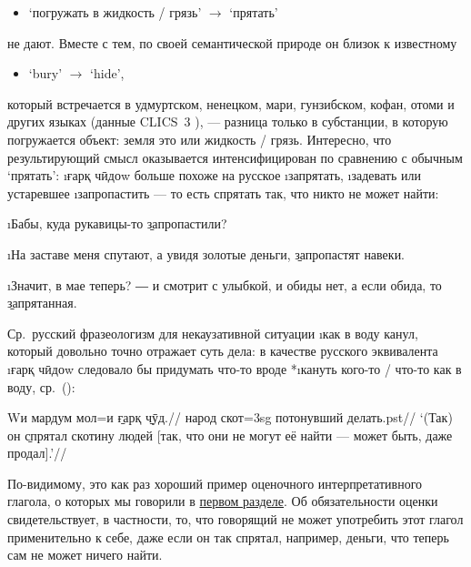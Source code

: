 \begin{itemize}
  \item ‘погружать в жидкость / грязь’ $\rightarrow$ ‘прятать’
\end{itemize}

не дают. Вместе с тем, по своей семантической природе он близок к известному

\begin{itemize}
  \item ‘bury’ $\rightarrow$ ‘hide’,
\end{itemize}

который встречается в удмуртском, ненецком, мари, гунзибском, кофан, отоми и других языках (данные CLICS~3 \parencite{clics2020}), — разница только в субстанции, в которую погружается объект: земля это или жидкость / грязь. Интересно, что результирующий смысл оказывается интенсифицирован по сравнению с обычным ‘прятать’: \i{ғарқ чӣдоw} больше похоже на русское \i{запрятать}, \i{задевать} или устаревшее \i{запропастить} — то есть спрятать так, что никто не может найти:

\i{Бабы, куда рукавицы-то \b{запропастили}?}  \xe

\i{На заставе меня спутают, а увидя золотые деньги, \b{запропастят} навеки.}  \xe

\i{Значит, в мае теперь? ― и смотрит с улыбкой, и обиды нет, а если обида, то \b{запрятанная}.}  \xe

Ср.~русский фразеологизм для некаузативной ситуации \i{как в воду канул}, который довольно точно отражает суть дела: в качестве русского эквивалента \i{ғарқ чӣдоw} следовало бы придумать что-то вроде *\i{кануть кого-то / что-то как в воду}, ср.~():

\begingl
\gla Wи мардум мол=и \b{ғарқ} \b{чӯд}.//
 народ скот={\sc 3sg} потонувший делать.{\sc pst}//
\glft ‘(Так) он \b{спрятал} скотину людей [так, что они не могут её найти — может быть, даже продал].’//
\endgl \xe

По-видимому, это как раз хороший пример оценочного интерпретативного глагола, о которых мы говорили в \hyperref[hide-intro]{первом разделе}. Об обязательности оценки свидетельствует, в частности, то, что говорящий не может употребить этот глагол применительно к себе, даже если он так спрятал, например, деньги, что теперь сам не может ничего найти.

